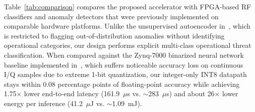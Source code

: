 \documentclass[conference]{IEEEtran}
\begin{document}



Table~\ref{tab:comparison} compares the proposed accelerator with FPGA-based RF classifiers and anomaly detectors that were previously implemented on comparable hardware platforms. Unlike the unsupervised autoencoder in~\cite{b10}, which is restricted to flagging out-of-distribution anomalies without identifying operational categories, our design performs explicit multi-class operational threat classification. When compared against the Zynq-7000 binarized neural network baseline implemented in~\cite{b14}, which suffers noticeable accuracy loss on continuous I/Q samples due to extreme 1-bit quantization, our integer-only INT8 datapath stays within 0.08 percentage points of floating-point accuracy while achieving 1.75$\times$ lower end-to-end latency (161.9~$\mu$s vs. $\sim$283~$\mu$s) and about 26$\times$ lower energy per inference (41.2~$\mu$J vs. $\sim$1.09~mJ).
\end{document}
